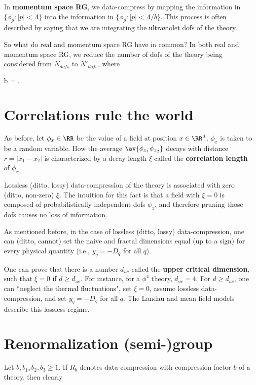 \documentclass[12pt]{article}
\begin{document}
In {\bf momentum space RG},
we data-compress by mapping the
information in $\{\phi_p: |p|<\Lambda\}$
into the information in
$\{\phi_p: |p|<\Lambda/b\}$.
This process is often described
by saying that we are
integrating the ultraviolet dofs of the theory.

So what do real and momentum space RG
have in common?
In both real and momentum space RG,
we reduce the number of dofs
 of the theory being considered
from $N_{dofs}$ to $N'_{dofs}$, where

\beq
b = 
\;.
\eeq


\section{Correlations rule the world}
\label{sec-corr}

As before, let
 $\phi_x\in \RR$
be the value of a field
at position $x\in \RR^d$.
 $\phi_x$
is taken to be a random variable.
How the average $\av{\phi_{x_1}\phi_{x_2}}$
decays with distance $r=|x_1-x_2|$
is characterized by a decay length $\xi$
called the \textbf{correlation length}
 of $\phi_x$.



Lossless (ditto, lossy) data-compression
of the theory
is associated with zero (ditto, non-zero)
$\xi$.
The intuition
for this fact is that a field with
$\xi=0$ is composed of
probabilistically independent dofs $\phi_x$,
and therefore pruning those
dofs causes no loss of information.


As mentioned before, in the
case of lossless (ditto, lossy)
data-compression, one can (ditto, cannot)
set the naive and fractal dimensions
 equal (up to a sign) for every
physical quantity (i.e.,
$y_q=-D_q$ for all $q$).

One can prove that there is
a number $d_{uc}$ called
the \textbf{upper critical dimension},
such that $\xi=0$
if $d\geq d_{uc}$.
For instance, for a $\phi^4$
theory, $d_{uc}=4$. For $d\geq d_{uc}$,
one can ``neglect the thermal
fluctuations", set $\xi=0$,
assume lossless data-compression,
and
set $y_q=-D_q$ for all $q$.
The Landau and mean field
models describe this lossless regime.



\section{Renormalization (semi-)group}
Let $b, b_1,b_2,b_3\geq 1$.
If $R_b$ denotes
 data-compression
with compression factor $b$
of a  theory, then clearly
\end{document}
